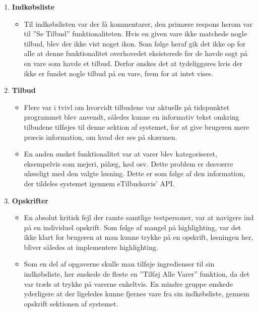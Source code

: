 \begin{enumerate}
   \item \textbf{Indkøbsliste} \begin{itemize}
   								  \item Til indkøbslisten var der få kommentarer, den primære respons herom var til ''Se Tilbud'' funktionaliteten. Hvis en given vare ikke matchede nogle tilbud, blev der ikke vist noget ikon. Som følge heraf gik det ikke op for alle at denne funktionalitet overhovedet eksisterede før de havde søgt på en vare som havde et tilbud. Derfor ønskes det at tydeliggøres hvis der ikke er fundet nogle tilbud på en vare, frem for at intet vises.
   							   \end{itemize}
   \item \textbf{Tilbud}\begin{itemize}
   								  \item Flere var i tvivl om hvorvidt tilbudene var aktuelle på tidspunktet programmet blev anvendt, således kunne en informativ tekst omkring tilbudene tilføjes til denne sektion af systemet, for at give brugeren mere præcis information, om hvad der ses på skærmen.
   								  
   								  \item En anden ønsket funktionalitet var at varer blev kategoriseret, eksempelvis som mejeri, pålæg, kød osv. Dette problem er desværre uløseligt med den valgte løsning.
   								  Dette er som følge af den information, der tildeles systemet igennem eTilbudsavis' API.
   							   \end{itemize}
   \item \textbf{Opskrifter}\begin{itemize}
   								  \item En absolut kritisk fejl der ramte samtlige testpersoner, var at navigere ind på en individuel opskrift. Som følge af mangel på highlighting, var det ikke klart for brugeren at man kunne trykke på en opskrift, løsningen her, bliver således at implementere highlighting.
   								  
   								  \item Som en del af opgaverne skulle man tilføje ingredienser til sin indkøbsliste, her ønskede de fleste en ''Tilføj Alle Varer'' funktion, da det var træls at trykke på varerne enkeltvis.
   								  En mindre gruppe ønskede yderligere at der ligeledes kunne fjernes vare fra sin indkøbsliste, gennem opskrift sektionen af systemet.
   								  

\end{itemize}
\end{enumerate}

